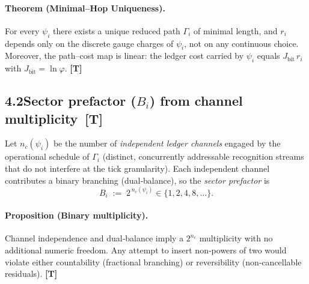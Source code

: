 \documentclass[11pt]{article}
\begin{document}
\paragraph{Theorem (Minimal–Hop Uniqueness).} For every \(\psi_i\) there exists a unique reduced path \(\Gamma_i\) of minimal length, and \(r_i\) depends only on the discrete gauge charges of \(\psi_i\), not on any continuous choice. Moreover, the path–cost map is linear: the ledger cost carried by \(\psi_i\) equals \(J_{\text{bit}}\,r_i\) with \(J_{\text{bit}}=\ln\varphi\). \textbf{[T]}%

\subsection*{4.2\quad Sector prefactor \texorpdfstring{(\(B_i\))}{(B_i)} from channel multiplicity \,[T]}
Let \(n_c(\psi_i)\) be the number of \emph{independent ledger channels} engaged by the operational schedule of \(\Gamma_i\) (distinct, concurrently addressable recognition streams that do not interfere at the tick granularity). Each independent channel contributes a binary branching (dual‑balance), so the \emph{sector prefactor} is
\[
  B_i\;:=\;2^{\,n_c(\psi_i)}\in\{1,2,4,8,\dots\}.
\]
\paragraph{Proposition (Binary multiplicity).} Channel independence and dual‑balance imply a \(2^{n_c}\) multiplicity with no additional numeric freedom. Any attempt to insert non‑powers of two would violate either countability (fractional branching) or reversibility (non‑cancellable residuals). \textbf{[T]}%
\end{document}
